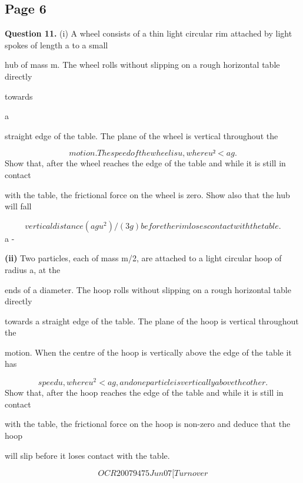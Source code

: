 \documentclass[12pt]{article}
\begin{document}
\subsection*{Page 6}
\begin{flushleft}
\bigskip\textbf{Question 11.} (i) A wheel consists of a thin light circular rim attached by light spokes of length a to a small\par
hub of mass m. The wheel rolls without slipping on a rough horizontal table directly\par
towards\par
a\par
straight edge of the table. The plane of the wheel is vertical throughout the\par
\[motion. The speed of the wheel is u, where u² < ag.\]
Show that, after the wheel reaches the edge of the table and while it is still in contact\par
with the table, the frictional force on the wheel is zero. Show also that the hub will fall\par
\[vertical distance (ag u^2)/(3g) before the rim loses contact with the table.\]
a -\par
\textbf{(ii)} Two particles, each of mass m/2, are attached to a light circular hoop of radius a, at the\par
ends of a diameter. The hoop rolls without slipping on a rough horizontal table directly\par
towards a straight edge of the table. The plane of the hoop is vertical throughout the\par
motion. When the centre of the hoop is vertically above the edge of the table it has\par
\[speed u, where u^2 < ag, and one particle is vertically above the other.\]
Show that, after the hoop reaches the edge of the table and while it is still in contact\par
with the table, the frictional force on the hoop is non-zero and deduce that the hoop\par
will slip before it loses contact with the table.\par
\[OCR 2007 9475 Jun07 [Turn over\]
\end{flushleft}
\end{document}
